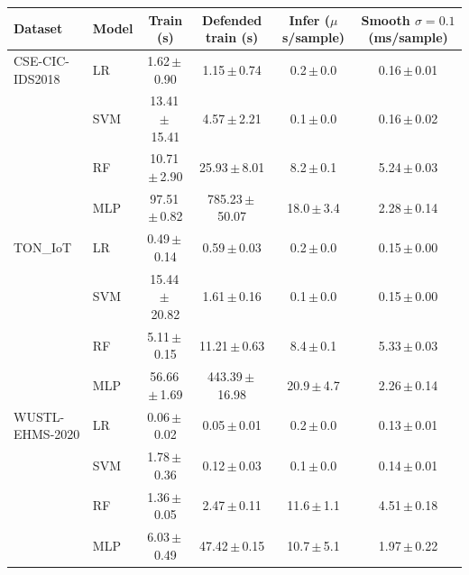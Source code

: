 \begin{tabular}{l l c c c c}
\toprule
\textbf{Dataset} & \textbf{Model} & \textbf{Train (s)} & \textbf{Defended train (s)} & \textbf{Infer ($\mu$s/sample)} & \textbf{Smooth $\sigma{=}0.1$ (ms/sample)} \\
\midrule
CSE-CIC-IDS2018 & LR & 1.62\,$\pm$\,0.90 & 1.15\,$\pm$\,0.74 & 0.2\,$\pm$\,0.0 & 0.16\,$\pm$\,0.01 \\
 & SVM & 13.41\,$\pm$\,15.41 & 4.57\,$\pm$\,2.21 & 0.1\,$\pm$\,0.0 & 0.16\,$\pm$\,0.02 \\
 & RF & 10.71\,$\pm$\,2.90 & 25.93\,$\pm$\,8.01 & 8.2\,$\pm$\,0.1 & 5.24\,$\pm$\,0.03 \\
 & MLP & 97.51\,$\pm$\,0.82 & 785.23\,$\pm$\,50.07 & 18.0\,$\pm$\,3.4 & 2.28\,$\pm$\,0.14 \\
TON\_IoT & LR & 0.49\,$\pm$\,0.14 & 0.59\,$\pm$\,0.03 & 0.2\,$\pm$\,0.0 & 0.15\,$\pm$\,0.00 \\
 & SVM & 15.44\,$\pm$\,20.82 & 1.61\,$\pm$\,0.16 & 0.1\,$\pm$\,0.0 & 0.15\,$\pm$\,0.00 \\
 & RF & 5.11\,$\pm$\,0.15 & 11.21\,$\pm$\,0.63 & 8.4\,$\pm$\,0.1 & 5.33\,$\pm$\,0.03 \\
 & MLP & 56.66\,$\pm$\,1.69 & 443.39\,$\pm$\,16.98 & 20.9\,$\pm$\,4.7 & 2.26\,$\pm$\,0.14 \\
WUSTL-EHMS-2020 & LR & 0.06\,$\pm$\,0.02 & 0.05\,$\pm$\,0.01 & 0.2\,$\pm$\,0.0 & 0.13\,$\pm$\,0.01 \\
 & SVM & 1.78\,$\pm$\,0.36 & 0.12\,$\pm$\,0.03 & 0.1\,$\pm$\,0.0 & 0.14\,$\pm$\,0.01 \\
 & RF & 1.36\,$\pm$\,0.05 & 2.47\,$\pm$\,0.11 & 11.6\,$\pm$\,1.1 & 4.51\,$\pm$\,0.18 \\
 & MLP & 6.03\,$\pm$\,0.49 & 47.42\,$\pm$\,0.15 & 10.7\,$\pm$\,5.1 & 1.97\,$\pm$\,0.22 \\
\bottomrule
\end{tabular}
